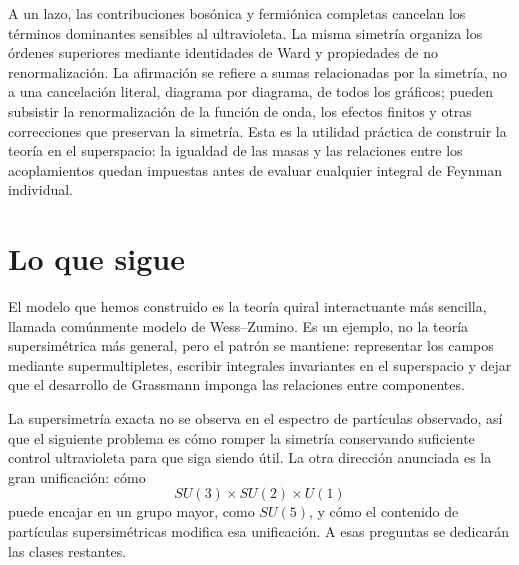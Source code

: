A un lazo, las contribuciones bosónica y fermiónica completas cancelan los términos dominantes sensibles al ultravioleta. La misma simetría organiza los órdenes superiores mediante identidades de Ward y propiedades de no renormalización. La afirmación se refiere a sumas relacionadas por la simetría, no a una cancelación literal, diagrama por diagrama, de todos los gráficos; pueden subsistir la renormalización de la función de onda, los efectos finitos y otras correcciones que preservan la simetría. Esta es la utilidad práctica de construir la teoría en el superspacio: la igualdad de las masas y las relaciones entre los acoplamientos quedan impuestas antes de evaluar cualquier integral de Feynman individual.

\section{Lo que sigue}

El modelo que hemos construido es la teoría quiral interactuante más sencilla, llamada comúnmente modelo de Wess--Zumino. Es un ejemplo, no la teoría supersimétrica más general, pero el patrón se mantiene: representar los campos mediante supermultipletes, escribir integrales invariantes en el superspacio y dejar que el desarrollo de Grassmann imponga las relaciones entre componentes.

La supersimetría exacta no se observa en el espectro de partículas observado, así que el siguiente problema es cómo romper la simetría conservando suficiente control ultravioleta para que siga siendo útil. La otra dirección anunciada es la gran unificación: cómo
\begin{equation}
SU(3)\times SU(2)\times U(1)
\end{equation}
puede encajar en un grupo mayor, como \(SU(5)\), y cómo el contenido de partículas supersimétricas modifica esa unificación. A esas preguntas se dedicarán las clases restantes.
